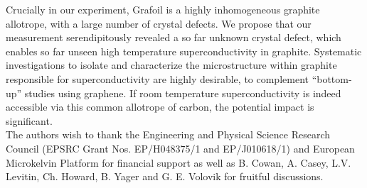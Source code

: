 \documentclass[aps,prb,reprint,twocolumn,showpacs]{revtex4-1}
\begin{document}
Crucially in our experiment, Grafoil is a highly inhomogeneous graphite allotrope, with a large number of crystal defects. We propose that our measurement serendipitously revealed a so far unknown crystal defect, which enables so far unseen high temperature superconductivity in graphite. Systematic investigations to isolate and characterize the microstructure within graphite responsible for superconductivity are highly desirable, to complement "`bottom-up"' studies using graphene. If room temperature superconductivity is indeed accessible via this common allotrope of carbon, the potential impact is significant.\\
The authors wish to thank the Engineering and Physical Science Research Council (EPSRC Grant Nos.  EP/H048375/1 and EP/J010618/1) and European Microkelvin Platform for financial support as well as B. Cowan, A. Casey, L.V. Levitin, Ch. Howard, B. Yager and G. E. Volovik for fruitful discussions.
\end{document}

